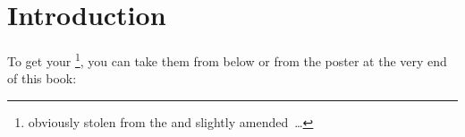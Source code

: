 \chapter{Introduction}\label{sec:Introduction}

To get your \footnote{obviously stolen from the  \autocite{WIKIPEDIA:ZenOfPython,PYTHON_ORG_MAILING_LIST:ThePythonWay} and slightly amended~…}, you can take them from below or from the poster at the very end of this book:

















